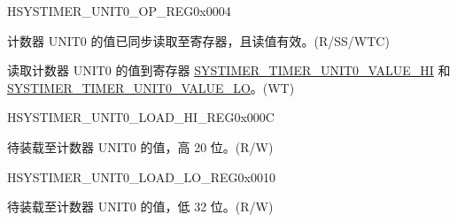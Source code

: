 \begin{register}{H}{SYSTIMER\_UNIT0\_OP\_REG}{0x0004}\label{regdesc:SYSTIMERUNIT0OPREG}
%
%
%
%
\regnewline%
\begin{regdesc}\begin{reglist}
\label{fielddesc:SYSTIMERTIMERUNIT0VALUEVALID}\item [SYSTIMER\_TIMER\_UNIT0\_VALUE\_VALID] 计数器 UNIT0 的值已同步读取至寄存器，且读值有效。(R/SS/WTC)
\label{fielddesc:SYSTIMERTIMERUNIT0UPDATE}\item [SYSTIMER\_TIMER\_UNIT0\_UPDATE] 读取计数器 UNIT0 的值到寄存器 \hyperref[fielddesc:SYSTIMERTIMERUNIT0VALUEHI]{SYSTIMER\_TIMER\_UNIT0\_VALUE\_HI} 和 \hyperref[fielddesc:SYSTIMERTIMERUNIT0VALUELO]{SYSTIMER\_TIMER\_UNIT0\_VALUE\_LO}。(WT)
\end{reglist}\end{regdesc}
\end{register}


\begin{register}{H}{SYSTIMER\_UNIT0\_LOAD\_HI\_REG}{0x000C}\label{regdesc:SYSTIMERUNIT0LOADHIREG}
%
%
\regnewline%
\begin{regdesc}\begin{reglist}
\label{fielddesc:SYSTIMERTIMERUNIT0LOADHI}\item [SYSTIMER\_TIMER\_UNIT0\_LOAD\_HI] 待装载至计数器 UNIT0 的值，高 20 位。(R/W)
\end{reglist}\end{regdesc}
\end{register}


\begin{register}{H}{SYSTIMER\_UNIT0\_LOAD\_LO\_REG}{0x0010}\label{regdesc:SYSTIMERUNIT0LOADLOREG}
%
\regnewline%
\begin{regdesc}\begin{reglist}
\label{fielddesc:SYSTIMERTIMERUNIT0LOADLO}\item [SYSTIMER\_TIMER\_UNIT0\_LOAD\_LO] 待装载至计数器 UNIT0 的值，低 32 位。(R/W)
\end{reglist}\end{regdesc}
\end{register}


